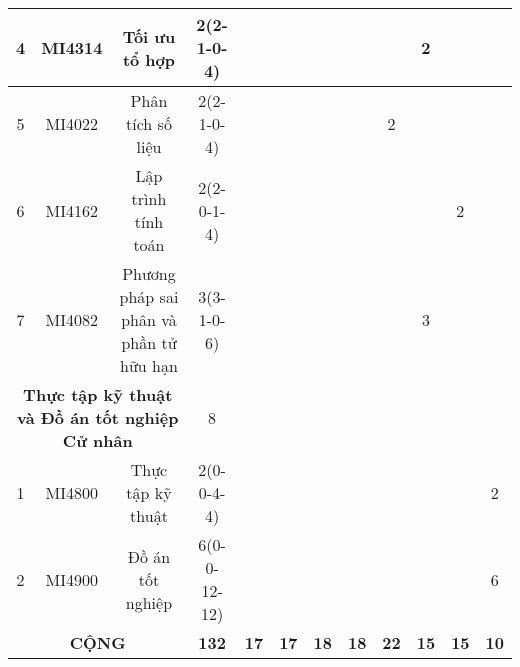 \documentclass[12pt,a4paper]{report}
\begin{document}
\begin{landscape}
\begin{longtable}[c]{|c|c|c|c|c|c|c|c|c|c|c|c|}
        4                             & MI4314                          & Tối ưu tổ hợp                                                & 2(2-1-0-4)                                                                           &             &             &             &             &             & 2           &             &             \\ \hline
        5                             & MI4022                          & Phân tích số liệu                                            & 2(2-1-0-4)                                                                           &             &             &             &             & 2           &             &             &             \\ \hline
        6                             & MI4162                          & Lập trình tính toán                                          & 2(2-0-1-4)                                                                           &             &             &             &             &             &             & 2           &             \\ \hline
        7                             & MI4082                          & Phương pháp sai phân và phần tử hữu hạn                      & 3(3-1-0-6)                                                                           &             &             &             &             &             & 3           &             &             \\ \hline
        \multicolumn{3}{|c|}{\textbf{Thực tập kỹ thuật và Đồ án tốt nghiệp Cử nhân}}                                                   & 8                                                                                    &             &             &             &             &             &             &             &             \\ \hline
        1                             & MI4800                          & Thực tập kỹ thuật                                            & 2(0-0-4-4)                                                                           &             &             &             &             &             &             &             & 2           \\ \hline
        2                             & MI4900                          & Đồ án tốt nghiệp                                             & 6(0-0-12-12)                                                                         &             &             &             &             &             &             &             & 6           \\ \hline
        \multicolumn{3}{|c|}{\textbf{CỘNG}}                                                                                            & \textbf{132}                                                                         & \textbf{17} & \textbf{17} & \textbf{18} & \textbf{18} & \textbf{22} & \textbf{15} & \textbf{15} & \textbf{10} \\ \hline
        \end{longtable}
    \end{landscape}
\end{document}
